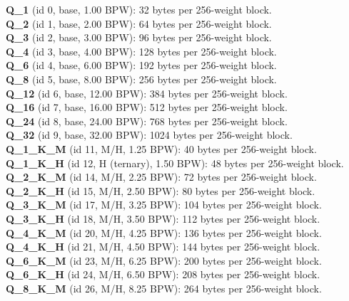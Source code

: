 \noindent\textbf{Q\_1} (id 0, base, 1.00 BPW): 32 bytes per 256-weight block. \\
\noindent\textbf{Q\_2} (id 1, base, 2.00 BPW): 64 bytes per 256-weight block. \\
\noindent\textbf{Q\_3} (id 2, base, 3.00 BPW): 96 bytes per 256-weight block. \\
\noindent\textbf{Q\_4} (id 3, base, 4.00 BPW): 128 bytes per 256-weight block. \\
\noindent\textbf{Q\_6} (id 4, base, 6.00 BPW): 192 bytes per 256-weight block. \\
\noindent\textbf{Q\_8} (id 5, base, 8.00 BPW): 256 bytes per 256-weight block. \\
\noindent\textbf{Q\_12} (id 6, base, 12.00 BPW): 384 bytes per 256-weight block. \\
\noindent\textbf{Q\_16} (id 7, base, 16.00 BPW): 512 bytes per 256-weight block. \\
\noindent\textbf{Q\_24} (id 8, base, 24.00 BPW): 768 bytes per 256-weight block. \\
\noindent\textbf{Q\_32} (id 9, base, 32.00 BPW): 1024 bytes per 256-weight block. \\
\noindent\textbf{Q\_1\_K\_M} (id 11, M/H, 1.25 BPW): 40 bytes per 256-weight block. \\
\noindent\textbf{Q\_1\_K\_H} (id 12, H (ternary), 1.50 BPW): 48 bytes per 256-weight block. \\
\noindent\textbf{Q\_2\_K\_M} (id 14, M/H, 2.25 BPW): 72 bytes per 256-weight block. \\
\noindent\textbf{Q\_2\_K\_H} (id 15, M/H, 2.50 BPW): 80 bytes per 256-weight block. \\
\noindent\textbf{Q\_3\_K\_M} (id 17, M/H, 3.25 BPW): 104 bytes per 256-weight block. \\
\noindent\textbf{Q\_3\_K\_H} (id 18, M/H, 3.50 BPW): 112 bytes per 256-weight block. \\
\noindent\textbf{Q\_4\_K\_M} (id 20, M/H, 4.25 BPW): 136 bytes per 256-weight block. \\
\noindent\textbf{Q\_4\_K\_H} (id 21, M/H, 4.50 BPW): 144 bytes per 256-weight block. \\
\noindent\textbf{Q\_6\_K\_M} (id 23, M/H, 6.25 BPW): 200 bytes per 256-weight block. \\
\noindent\textbf{Q\_6\_K\_H} (id 24, M/H, 6.50 BPW): 208 bytes per 256-weight block. \\
\noindent\textbf{Q\_8\_K\_M} (id 26, M/H, 8.25 BPW): 264 bytes per 256-weight block. \\
